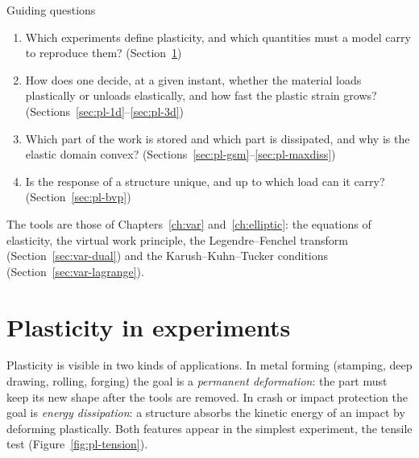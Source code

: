 \begin{gbox}{Guiding questions}
\begin{enumerate}[itemsep=1pt]
  \item Which experiments define plasticity, and which quantities must a
  model carry to reproduce them? (Section~\ref{sec:pl-intro})
  \item How does one decide, at a given instant, whether the material loads
  plastically or unloads elastically, and how fast the plastic strain grows?
  (Sections~\ref{sec:pl-1d}--\ref{sec:pl-3d})
  \item Which part of the work is stored and which part is dissipated, and
  why is the elastic domain convex? (Sections~\ref{sec:pl-gsm}--\ref{sec:pl-maxdiss})
  \item Is the response of a structure unique, and up to which load can it
  carry? (Section~\ref{sec:pl-bvp})
\end{enumerate}
The tools are those of Chapters~\ref{ch:var} and~\ref{ch:elliptic}: the
equations of elasticity, the virtual work principle, the Legendre--Fenchel
transform (Section~\ref{sec:var-dual}) and the Karush--Kuhn--Tucker conditions
(Section~\ref{sec:var-lagrange}).
\end{gbox}

\section{Plasticity in experiments}\label{sec:pl-intro}
%
Plasticity is visible in two kinds of applications. In metal forming
(stamping, deep drawing, rolling, forging) the goal is a \emph{permanent
deformation}: the part must keep its new shape after the tools are removed. In
crash or impact protection the goal is \emph{energy dissipation}: a structure
absorbs the kinetic energy of an impact by deforming plastically. Both
features appear in the simplest experiment, the tensile test
(Figure~\ref{fig:pl-tension}).

